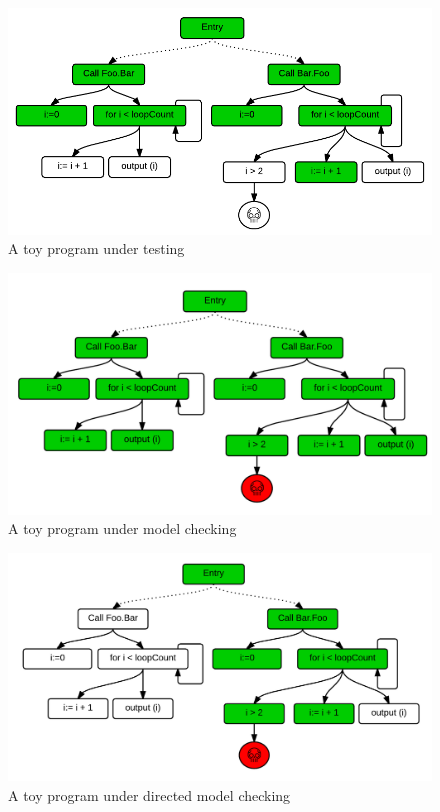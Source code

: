 \documentclass[12pt]{report}
\begin{document}
\begin{figure}
  \centering
    \includegraphics[scale=0.8]{media/chap8/test.png}
    \caption{A toy program under testing
    \label{fig:testing-toy}}
\end{figure}

\begin{figure}
  \centering
    \includegraphics[scale=0.8]{media/chap8/mc.png}
    \caption{A toy program under model checking
    \label{fig:checking-toy}}
\end{figure}

\begin{figure}
  \centering
    \includegraphics[scale=0.8]{media/chap8/dmc.png}
    \caption{A toy program under directed model checking
    \label{fig:dchecking-toy}}
\end{figure}
\end{document}
